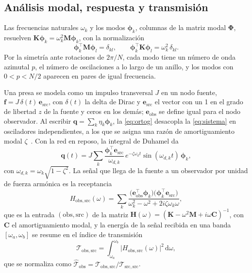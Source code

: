 \documentclass[fleqn,final]{jaes}
\begin{document}
\subsection{Análisis modal, respuesta y transmisión}

Las frecuencias naturales $\omega_k$ y
los modos $\boldsymbol{\phi}_k$, columnas de la matriz modal
$\boldsymbol{\Phi}$, resuelven
$\mathbf{K}\boldsymbol{\phi}_k=\omega_k^2\mathbf{M}\boldsymbol{\phi}_k$,
con la normalización
\begin{equation}
  \boldsymbol{\phi}_k^{\top}\mathbf{M}\boldsymbol{\phi}_l=\delta_{kl},\qquad
  \boldsymbol{\phi}_k^{\top}\mathbf{K}\boldsymbol{\phi}_l=\omega_k^2\,\delta_{kl}.
  \label{eq:ortog}
\end{equation}
Por la simetría ante rotaciones de $2\pi/N$, cada modo tiene un número de
onda azimutal $p$, el número de oscilaciones a lo largo de un anillo, y
los modos con $0<p<N/2$ aparecen en pares de igual frecuencia.

Una presa se modela como un impulso transversal $J$ en un nodo fuente,
$\mathbf{f}=J\,\delta(t)\,\mathbf{e}_{\mathrm{src}}$, con $\delta(t)$ la
delta de Dirac y $\mathbf{e}_{\mathrm{src}}$ el vector con un 1 en el
grado de libertad $z$ de la fuente y ceros en los demás; $\mathbf{e}_{\mathrm{obs}}$ se
define igual para el nodo observador. Al escribir
$\mathbf{q}=\sum_k\eta_k\boldsymbol{\phi}_k$, la \cref{eq:ortog}
desacopla la \cref{eq:sistema} en osciladores independientes, a los que se
asigna una razón de amortiguamiento modal
$\zeta$~\cite{inman2014}. Con la red en reposo, la integral de Duhamel da
\begin{equation}
  \mathbf{q}(t)=J\sum_k
  \frac{\boldsymbol{\phi}_k^{\top}\mathbf{e}_{\mathrm{src}}}{\omega_{d,k}}\,
  e^{-\zeta\omega_k t}\sin(\omega_{d,k}t)\,\boldsymbol{\phi}_k,
  \label{eq:impulso}
\end{equation}
con $\omega_{d,k}=\omega_k\sqrt{1-\zeta^2}$. La señal que llega de la
fuente a un observador por unidad de fuerza armónica es la
receptancia~\cite{ewins2000}
\begin{equation}
  H_{\mathrm{obs},\mathrm{src}}(\omega)=\sum_k
  \frac{\bigl(\mathbf{e}_{\mathrm{obs}}^{\top}\boldsymbol{\phi}_k\bigr)
        \bigl(\boldsymbol{\phi}_k^{\top}\mathbf{e}_{\mathrm{src}}\bigr)}
       {\omega_k^2-\omega^2+2i\zeta\omega_k\omega},
  \label{eq:H}
\end{equation}
que es la entrada $(\mathrm{obs},\mathrm{src})$ de la matriz
$\mathbf{H}(\omega)=(\mathbf{K}-\omega^2\mathbf{M}+i\omega\mathbf{C})^{-1}$, %
con $\mathbf{C}$ el amortiguamiento modal, y la energía de la señal recibida en una banda $[\omega_a,\omega_b]$ se
resume en el índice de transmisión
\begin{equation}
  \mathcal{T}_{\mathrm{obs},\mathrm{src}}=\int_{\omega_a}^{\omega_b}
  \bigl|H_{\mathrm{obs},\mathrm{src}}(\omega)\bigr|^2\,\mathrm{d}\omega ,
  \label{eq:indice}
\end{equation}
que se normaliza como
$\hat{\mathcal{T}}_{\mathrm{obs}}=\mathcal{T}_{\mathrm{obs},\mathrm{src}}/
\mathcal{T}_{\mathrm{src},\mathrm{src}}$.
\end{document}
